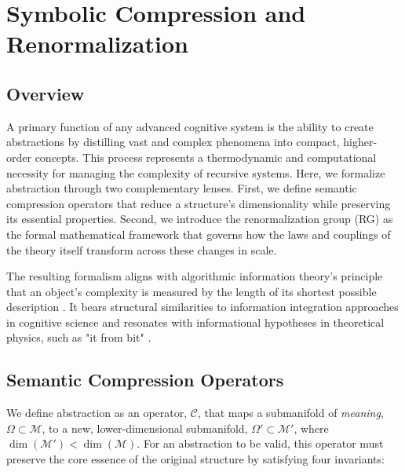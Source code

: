 \chapter{Symbolic Compression and Renormalization}
\label{15:symbolic_compression_and_renormalization}


\section{Overview}
\label{15.1:overview}

A primary function of any advanced cognitive system is the ability to create abstractions by distilling vast and complex phenomena into compact, higher-order concepts. This process represents a thermodynamic and computational necessity for managing the complexity of recursive systems. Here, we formalize abstraction through two complementary lenses. First, we define semantic compression operators that reduce a structure's dimensionality while preserving its essential properties. Second, we introduce the renormalization group (RG) as the formal mathematical framework that governs how the laws and couplings of the theory itself transform across these changes in scale.

The resulting formalism aligns with algorithmic information theory's principle that an object's complexity is measured by the length of its shortest possible description \autocite{Kolmogorov1965, Chaitin1966}. It bears structural similarities to information integration approaches in cognitive science \autocite{Tononi2004} and resonates with informational hypotheses in theoretical physics, such as "it from bit" \autocite{Wheeler1990}.


\section{Semantic Compression Operators}
\label{15.2:semantic_compression_operators}

We define abstraction as an operator, \(\mathcal{C}\), that maps a submanifold of \textit{meaning}, \(\Omega \subset \mathcal{M}\), to a new, lower-dimensional submanifold, \(\Omega' \subset \mathcal{M}'\), where \(\dim(\mathcal{M}') < \dim(\mathcal{M})\). For an abstraction to be valid, this operator must preserve the core essence of the original structure by satisfying four invariants:

